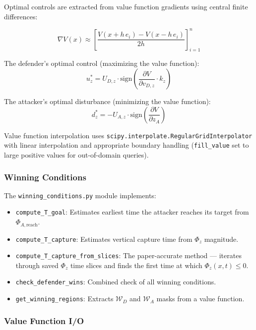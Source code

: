 \documentclass[11pt,a4paper]{article}
\begin{document}
Optimal controls are extracted from value function gradients using central finite differences:

\begin{equation}
\nabla V(x) \approx \left[\frac{V(x + h\,e_i) - V(x - h\,e_i)}{2h}\right]_{i=1}^n
\end{equation}

The defender's optimal control (maximizing the value function):
\begin{equation}
u_z^* = U_{D,z} \cdot \text{sign}\!\left(\frac{\partial V}{\partial v_{D,z}} \cdot k_z\right)
\end{equation}

The attacker's optimal disturbance (minimizing the value function):
\begin{equation}
d_z^* = -U_{A,z} \cdot \text{sign}\!\left(\frac{\partial V}{\partial z_A}\right)
\end{equation}

Value function interpolation uses \texttt{scipy.interpolate.RegularGridInterpolator} with linear interpolation and appropriate boundary handling (\texttt{fill\_value} set to large positive values for out-of-domain queries).

\subsubsection{Winning Conditions}

The \texttt{winning\_conditions.py} module implements:

\begin{itemize}
    \item \texttt{compute\_T\_goal}: Estimates earliest time the attacker reaches its target from $\Phi_{A,\text{reach}}$.
    \item \texttt{compute\_T\_capture}: Estimates vertical capture time from $\Phi_z$ magnitude.
    \item \texttt{compute\_T\_capture\_from\_slices}: The paper-accurate method --- iterates through saved $\Phi_z$ time slices and finds the first time at which $\Phi_z(x, t) \leq 0$.
    \item \texttt{check\_defender\_wins}: Combined check of all winning conditions.
    \item \texttt{get\_winning\_regions}: Extracts $\mathcal{W}_D$ and $\mathcal{W}_A$ masks from a value function.
\end{itemize}

\subsubsection{Value Function I/O}
\end{document}
